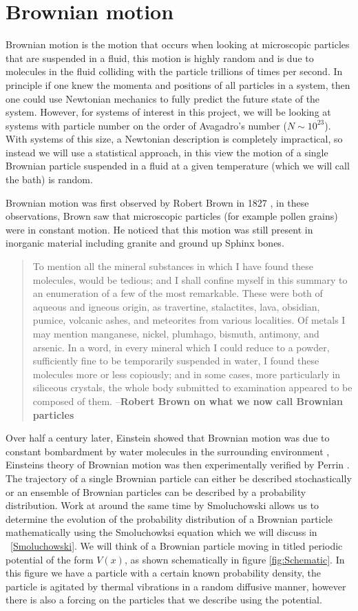 \section{Brownian motion}
Brownian motion is the motion that occurs when looking at microscopic particles that are suspended in a fluid, this motion is highly random and is due to molecules in the fluid colliding with the particle trillions of times per second. In principle if one knew the momenta and positions of all particles in a system, then one could use Newtonian mechanics to fully predict the future state of the system. However, for systems of interest in this project, we will be looking at systems with particle number on the order of Avagadro's number ($N \sim 10^{23}$). With systems of this size, a Newtonian description is completely impractical, so instead we will use a statistical approach, in this view the motion of a single Brownian particle suspended in a fluid at a given temperature (which we will call the bath) is random.

Brownian motion was first observed by Robert Brown in 1827 \cite{Brown1828}, in these observations, Brown saw that microscopic particles (for example pollen grains) were in constant motion. He noticed that this motion was still present in inorganic material including granite and ground up Sphinx bones.
\begin{quote}
To mention all the mineral substances in which I have found these molecules, would be tedious; and I shall confine myself in this summary to an enumeration of a few of the most remarkable. These were both of aqueous and igneous origin, as travertine, stalactites, lava, obsidian, pumice, volcanic ashes, and meteorites from various localities. Of metals I may mention manganese, nickel, plumhago, bismuth, antimony, and arsenic. In a word, in every mineral which I could reduce to a powder, sufficiently fine to be temporarily suspended in water, I found these molecules more or less copiously; and in some cases, more particularly in siliceous crystals, the whole body submitted to examination appeared to be composed of them. --\textbf{Robert Brown on what we now call Brownian particles}
\end{quote}
Over half a century later, Einstein showed that Brownian motion was due to constant bombardment by water molecules in the surrounding environment \cite{Einstein1905}, Einsteins theory of Brownian motion was then experimentally verified by Perrin \cite{Perrin2013}. The trajectory of a single Brownian particle can either be described stochastically or an ensemble of Brownian particles can be described by a probability distribution. Work at around the same time by Smoluchowski allows us to determine the evolution of the probability distribution of a Brownian particle mathematically using the Smoluchowksi equation which we will discuss in ~\autoref{Smoluchowski}. We will think of a Brownian particle moving in titled periodic potential of the form $V(x)$, as shown schematically in figure \ref{fig:Schematic}. In this figure we have a particle with a certain known probability density, the particle is agitated by thermal vibrations in a random diffusive manner, however there is also a forcing on the particles that we describe using the potential.

